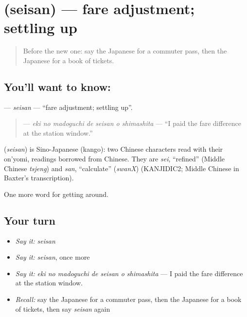 \section[\texorpdfstring{\ja{せいさん} (seisan)}{せいさん (seisan)}]{ (seisan) — fare adjustment; settling up}

\label{lesson:JA-C373-seisan}



\begin{quote}
Before the new one: say the Japanese for a commuter pass, then the Japanese for a book of tickets.
\end{quote}

\subsection*{You'll want to know: }
\textbf{} — \emph{seisan} — \textquotedblleft{}fare adjustment; settling up\textquotedblright{}.

\begin{quote}
\textbf{   } — \emph{eki no madoguchi de seisan o shimashita} — \textquotedblleft{}I paid the fare difference at the station window.\textquotedblright{}
\end{quote}

\begin{cousinweb}
\textbf{} (\emph{seisan}) is Sino-Japanese (kango): two Chinese characters read with their on'yomi, readings borrowed from Chinese. They are \emph{sei}, \textquotedblleft{}refined\textquotedblright{} (Middle Chinese \emph{tsjeng}) and \emph{san}, \textquotedblleft{}calculate\textquotedblright{} (\emph{swanX}) (KANJIDIC2; Middle Chinese in Baxter's transcription).
\end{cousinweb}

\begin{grammarlens}[title={What you've built}]
One more word for getting around.
\end{grammarlens}

\subsection*{Your turn}
\begin{itemize}
\raggedright
  \item \emph{Say it:} \emph{seisan}
  \item \emph{Say it:} \emph{seisan}, once more
  \item \emph{Say it:} \emph{eki no madoguchi de seisan o shimashita} — I paid the fare difference at the station window.
  \item \emph{Recall:} say the Japanese for a commuter pass, then the Japanese for a book of tickets, then say \emph{seisan} again
\end{itemize}

